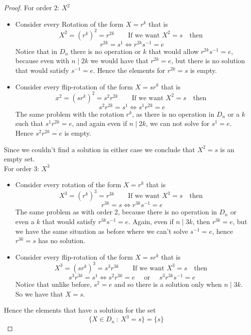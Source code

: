 \begin{assignment}[
  header=HeaderA,
  body=BodyA,
  title={Homework 2},
  duedate={17-February-2026},
  toc=false,
  toctitle={This appears on the Table of contents.},
  exlist=false
]
\begin{exer}[Problem 1.24]
\begin{proof}
For order $2$: $X^2$
\begin{itemize}
    \item Consider every Rotation of the form $X = r^k$ that is
    \[
    X^2 = (r^k)^2 = r^{2k} \quad \quad \text{If we want } X^2 = s \quad \text{then }
    \]
    \[
    r^{2k} = s^1  \iff r^{2k}s^{-1} = e 
    \]
    Notice that in $D_n$ there is no operation or $k$ that would allow $r^{2k}s^{-1} = e$, because even with $n\mid 2k$  we would have that $r^{2k} = e$, but there is no solution that would satisfy $s^{-1} = e$. Hence the elements for $r^{2k} = s$ is empty.
    \item Consider every flip-rotation of the form $X = sr^k$ that is
    \[
    x^2 = (sr^k)^2 = s^2r^{2k} \quad \quad \text{If we want } X^2 = s \quad \text{then }
    \]
    \[
    s^2r^{2k} = s^1 \iff s^{1}r^{2k} = e 
    \]
    The same problem with the rotation $r^k$, as there is no operation in $D_n$ or a $k$ such that $s^{1}r^{2k} = e$, and again even if $n\mid 2k$, we can not solve for $s^{1} = e$. Hence $s^2r^{2k} = e$ is empty. 
\end{itemize}
Since we couldn't find a solution in either case we conclude that $X^2 = s$ is an empty set.\\

For order $3$: $X^3$
\begin{itemize}
    \item Consider every rotation of the form $X = r^k$ that is
    \[
    X^3 = (r^k)^3 = r^{3k} \quad \quad \text{If we want } X^3 = s \quad \text{then }
    \]
    \[
    r^{3k} = s \iff r^{3k}s^{-1} = e
    \]
    The same problem as with order 2, because there is no operation in $D_n$ or even a $k$ that would satisfy $r^{3k}s^{-1} = e$. Again, even if $n\mid 3k$, then $r^{3k} = e$, but we have the same situation as before where we can't solve $s^{-1} = e$, hence $r^{3k} = s$ has no solution.
    \item  Consider every flip-rotation of the form $X = sr^k$ that is
    \[
    X^3 = (sr^k)^3 = s^3r^{3k} \quad \quad \text{If we want } X^3 = s \quad \text{then }
    \]
    \[
    s^3r^{3k} = s^1 \iff s^{2}r^{3k} = e \quad \text{ or } \quad  s^{3}r^{3k}s^{-1} = e
    \]
    Notice that unlike before, $s^{2} = e$ and so there is a solution only when $n \mid 3k$. So we have that $X = s$. 
\end{itemize}
Hence the elements that have a solution for the set
\[
\{ X \in D_n \ : \ X^3 = s \} = \{s\}
\]
\end{proof}
\end{exer}



\end{assignment}

